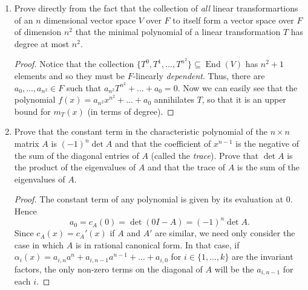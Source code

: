 \documentclass{report}
\DeclareMathOperator{\End}{End}
\begin{document}
\begin{enumerate}
\begin{proof}
			If $A$ and $B$ are $4\times 4$, this does not necessarily hold. For example, if 
			$$A=\begin{pmatrix}\lambda\\&\lambda\\&&0&-\lambda^2\\&&1&2\lambda\end{pmatrix}\text{ and }
			\begin{pmatrix}0&-\lambda^2\\1&2\lambda\\&&0&-\lambda^2\\&&1&2\lambda\end{pmatrix}$$
			then $m_A(x)=m_B(x)=(x-\lambda)^2$ and $c_A(x)=c_B(x)=(1-\lambda)^4$, but these matrices are already in rational canonical form, and so it is easy to see they are not similar.
		\end{proof}
	\item Prove directly from the fact that the collection of \textit{all} linear transformartions of an $n$ dimensional vector space $V$ over $F$ to itself form a vector space over $F$ of dimension $n^2$
		that the minimal polynomial of a linear transformation $T$ has degree at most $n^2$.
		\begin{proof}
			Notice that the collection $\{T^0,T^1,...,T^{n^2}\}\subseteq \End(V)$ has $n^2+1$ elements and so they must be $F$-linearly \textit{dependent}. 
			Thus, there are $a_0,...,a_{n^2}\in F$ such that $a_{n^2}T^{n^2}+...+a_0=0$. Now we can easily see that the polynomial $f(x)=a_{n^2}x^{n^2}+...+a_0$
			annihilates $T$, so that it is an upper bound for $m_T(x)$ (in terms of degree).
		\end{proof}
	\item Prove that the constant term in the characteristic polynomial of the $n\times n$ matrix $A$ is $(-1)^n\det A$ and that the coefficient of $x^{n-1}$
		is the negative of the sum of the diagonal entries of $A$ (called the \textit{trace}). Prove that $\det A$ is the product of the eigenvalues of $A$ and that the trace of $A$ is the sum of the eigenvalues of $A$.
		\begin{proof}
			The constant term of any polynomial is given by its evaluation at $0$. Hence 
			$$a_0=c_A(0)=\det(0I-A)=(-1)^n\det A.$$
			Since $c_A(x)=c_A'(x)$ if $A$ and $A'$ are similar, we need only consider the case in which $A$ is in rational canonical form.
			In that case, if $\alpha_i(x)=a_{i,n}a^n+a_{i,n-1}a^{n-1}+...+a_{i,0}$ for $i\in\{1,...,k\}$ are the invariant factors, the only non-zero terms on the diagonal of $A$ will be the $a_{i,n-1}$ for each $i$.

\end{proof}
\end{enumerate}
\end{document}
